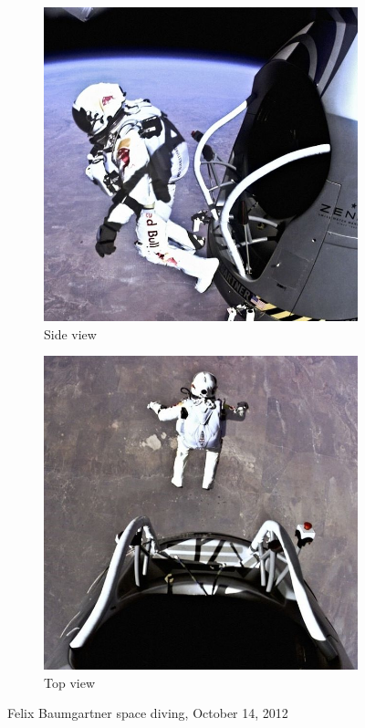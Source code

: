 \documentclass[a4paper, 14pt]{extarticle}
\begin{document}
\begin{figure}[ht]
  \begin{subfigure}{0.5\textwidth}
    \includegraphics[width=\linewidth]{Red Bull Stratos}
    \caption{Side view}
  \end{subfigure}
  \hfill
  \begin{subfigure}{0.5\textwidth}
    \includegraphics[width=\linewidth]{Felix Baumgartner}
    \caption{Top view}
  \end{subfigure}
  \caption{Felix Baumgartner space diving, October 14, 2012}
\end{figure}
\end{document}
